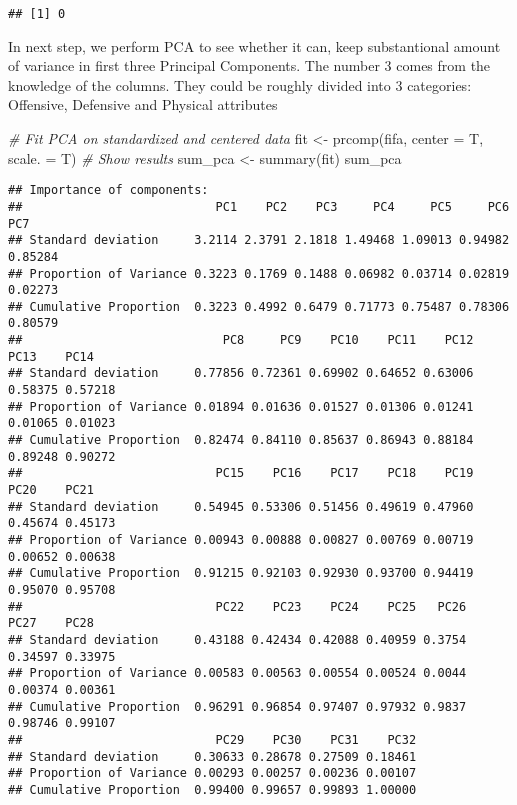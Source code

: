 \documentclass[
]{article}
\newenvironment{Shaded}{\begin{snugshade}}{\end{snugshade}}
\newcommand{\AttributeTok}[1]{\textcolor[rgb]{0.77,0.63,0.00}{#1}}
\newcommand{\CommentTok}[1]{\textcolor[rgb]{0.56,0.35,0.01}{\textit{#1}}}
\newcommand{\FunctionTok}[1]{\textcolor[rgb]{0.00,0.00,0.00}{#1}}
\newcommand{\NormalTok}[1]{#1}
\newcommand{\OtherTok}[1]{\textcolor[rgb]{0.56,0.35,0.01}{#1}}
\begin{document}
\begin{verbatim}
## [1] 0
\end{verbatim}

In next step, we perform PCA to see whether it can, keep substantional
amount of variance in first three Principal Components. The number 3
comes from the knowledge of the columns. They could be roughly divided
into 3 categories: Offensive, Defensive and Physical attributes

\begin{Shaded}
\begin{Highlighting}[]
\CommentTok{\# Fit PCA on standardized and centered data}
\NormalTok{fit }\OtherTok{\textless{}{-}} \FunctionTok{prcomp}\NormalTok{(fifa, }\AttributeTok{center =}\NormalTok{ T, }\AttributeTok{scale. =}\NormalTok{ T)}
\CommentTok{\# Show results}
\NormalTok{sum\_pca }\OtherTok{\textless{}{-}} \FunctionTok{summary}\NormalTok{(fit) }
\NormalTok{sum\_pca}
\end{Highlighting}
\end{Shaded}

\begin{verbatim}
## Importance of components:
##                           PC1    PC2    PC3     PC4     PC5     PC6     PC7
## Standard deviation     3.2114 2.3791 2.1818 1.49468 1.09013 0.94982 0.85284
## Proportion of Variance 0.3223 0.1769 0.1488 0.06982 0.03714 0.02819 0.02273
## Cumulative Proportion  0.3223 0.4992 0.6479 0.71773 0.75487 0.78306 0.80579
##                            PC8     PC9    PC10    PC11    PC12    PC13    PC14
## Standard deviation     0.77856 0.72361 0.69902 0.64652 0.63006 0.58375 0.57218
## Proportion of Variance 0.01894 0.01636 0.01527 0.01306 0.01241 0.01065 0.01023
## Cumulative Proportion  0.82474 0.84110 0.85637 0.86943 0.88184 0.89248 0.90272
##                           PC15    PC16    PC17    PC18    PC19    PC20    PC21
## Standard deviation     0.54945 0.53306 0.51456 0.49619 0.47960 0.45674 0.45173
## Proportion of Variance 0.00943 0.00888 0.00827 0.00769 0.00719 0.00652 0.00638
## Cumulative Proportion  0.91215 0.92103 0.92930 0.93700 0.94419 0.95070 0.95708
##                           PC22    PC23    PC24    PC25   PC26    PC27    PC28
## Standard deviation     0.43188 0.42434 0.42088 0.40959 0.3754 0.34597 0.33975
## Proportion of Variance 0.00583 0.00563 0.00554 0.00524 0.0044 0.00374 0.00361
## Cumulative Proportion  0.96291 0.96854 0.97407 0.97932 0.9837 0.98746 0.99107
##                           PC29    PC30    PC31    PC32
## Standard deviation     0.30633 0.28678 0.27509 0.18461
## Proportion of Variance 0.00293 0.00257 0.00236 0.00107
## Cumulative Proportion  0.99400 0.99657 0.99893 1.00000
\end{verbatim}
\end{document}
